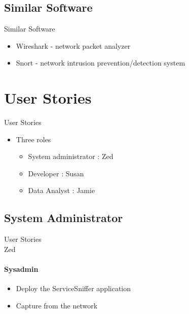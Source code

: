 \documentclass{beamer}
\begin{document}

\subsection{Similar Software}
\begin{frame}{Similar Software}
    \begin{itemize}
        \item Wireshark - network packet analyzer
        \item Snort - network intrusion prevention/detection system
    \end{itemize}
\end{frame}


\section{User Stories}
\begin{frame}{User Stories}
    \begin{itemize}
        \item Three roles
        \begin{itemize}
            \item System administrator : Zed 
            \item Developer : Susan
            \item Data Analyst : Jamie
        \end{itemize}
    \end{itemize}
\end{frame}


\subsection{System Administrator}
\begin{frame}{User Stories\\Zed}
    \framesubtitle{Sysadmin}
    \begin{itemize}
        \item Deploy the ServiceSniffer application
        \item Capture from the network
    \end{itemize}
\end{frame}
\end{document}
